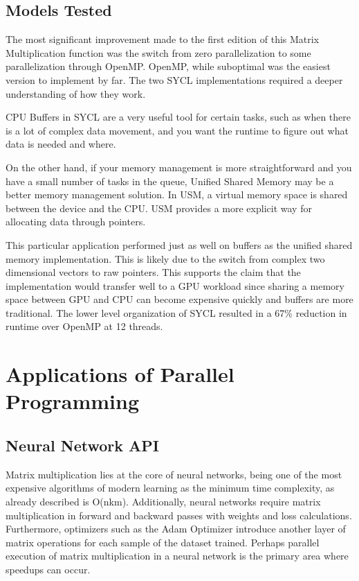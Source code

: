 \documentclass[journal]{IEEEtran}
\begin{document}
\subsection{Models Tested}
\par The most significant improvement made to the first edition of this Matrix Multiplication function was the switch from zero parallelization to some parallelization through OpenMP. OpenMP, while suboptimal was the easiest version to implement by far. The two SYCL implementations required a deeper understanding of how they work. 
\par CPU Buffers in SYCL are a very useful tool for certain tasks, such as when there is a lot of complex data movement, and you want the runtime to figure out what data is needed and where. 
\par On the other hand, if your memory management is more straightforward and you have a small number of tasks in the queue, Unified Shared Memory may be a better memory management solution. In USM, a virtual memory space is shared between the device and the CPU. USM provides a more explicit way for allocating data through pointers. 
\par This particular application performed just as well on buffers as the unified shared memory implementation. This is likely due to the switch from complex two dimensional vectors to raw pointers. This supports the claim that the implementation would transfer well to a GPU workload since sharing a memory space between GPU and CPU can become expensive quickly and buffers are more traditional. The lower level organization of SYCL resulted in a 67\% reduction in runtime over OpenMP at 12 threads.

\section{Applications of Parallel Programming}
\subsection{Neural Network API}
\par Matrix multiplication lies at the core of neural networks, being one of the most expensive algorithms of modern learning as the minimum time complexity, as already described is O(nkm). Additionally, neural networks require matrix multiplication in forward and backward passes with weights and loss calculations. Furthermore, optimizers such as the Adam Optimizer introduce another layer of matrix operations for each sample of the dataset trained. Perhaps parallel execution of matrix multiplication in a neural network is the primary area where speedups can occur.
\end{document}
